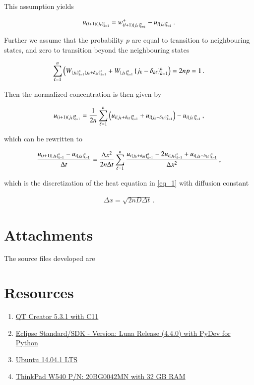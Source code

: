 \documentclass[11pt,english,a4paper]{article}
\begin{document}
\begin{flushleft}
This assumption yields

\begin{align*}
u_{(i+1)\left({j_k}\right)_{k=1}^n} = w_{(i+1)\left\lbrace{j_k}\right\rbrace_{k=1}^n}^+ - u_{i\left\lbrace{j_k}\right\rbrace_{k=1}^n} \,.
\end{align*}

Further we assume that the probability $p$ are equal to transition to neighbouring states, and zero to transition beyond the neighbouring states

\begin{align*}
\sum_{\ell=1}^n \left({W_{\left\lbrace{j_k}\right\rbrace_{k=1}^n\left\lbrace{j_k + \delta_{k\ell}}\right\rbrace_{k=1}^n} + W_{\left\lbrace{j_k}\right\rbrace_{k=1}^n}\left\lbrace{j_k - \delta_{k\ell}}\right\rbrace_{k=1}^n}\right) = 2n p = 1 \,.
\end{align*}

Then the normalized concentration is then given by

\begin{align*}
u_{(i+1)\left({j_k}\right)_{k=1}^n} = \frac{1}{2n}\sum_{\ell=1}^n\left({u_{i\left\lbrace{j_k+\delta_{k\ell}}\right\rbrace_{k=1}^n} + u_{i\left\lbrace{j_k-\delta_{k\ell}}\right\rbrace_{k=1}^n}}\right) - u_{i\left\lbrace{j_k}\right\rbrace_{k=1}^n} \,,
\end{align*}

which can be rewritten to

\begin{align}
\frac{u_{(i+1)\left\lbrace{j_k}\right\rbrace_{k=1}^n}-u_{i\left\lbrace{j_k}\right\rbrace_{k=1}^n}}{\Delta t} = \frac{\Delta x^2}{2n\Delta t}\sum_{\ell=1}^n\frac{u_{i\left\lbrace{j_k+\delta_{k\ell}}\right\rbrace_{k=1}^n} - 2 u_{i\left\lbrace{j_k}\right\rbrace_{k=1}^n} + u_{i\left\lbrace{j_k-\delta_{k\ell}}\right\rbrace_{k=1}^n}}{\Delta x^2} \,,
\label{eq_36}
\end{align}

which is the discretization of the heat equation in \eqref{eq_1} with diffusion constant

\begin{align}
\Delta x = \sqrt{2nD\Delta t}\,. 
\label{eq_37}
\end{align}


\section{Attachments}

The source files developed are


\section{Resources}

\begin{enumerate}
\item{\href{http://qt-project.org/downloads}{QT Creator 5.3.1 with C11}}
\item{\href{https://www.eclipse.org/downloads/}{Eclipse Standard/SDK  - Version: Luna Release (4.4.0) with PyDev for Python}}
\item{\href{http://www.ubuntu.com/download/desktop}{Ubuntu 14.04.1 LTS}}
\item{\href{http://shop.lenovo.com/no/en/laptops/thinkpad/w-series/w540/#tab-reseller}{ThinkPad W540 P/N: 20BG0042MN with 32 GB RAM}}
\end{enumerate}


\end{flushleft}
\end{document}
